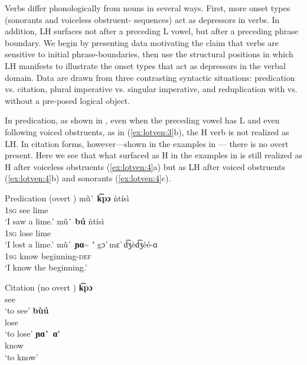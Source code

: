 \documentclass[output=paper
,newtxmath
,modfonts
,nonflat]{langsci/langscibook}
\begin{document}
Verbs differ phonologically from nouns in several ways. First, more onset types (sonorants and voiceless obstruent- sequences) act as depressors in verbs. In addition, LH  surfaces not after a preceding L  vowel, but after a preceding phrase boundary. We begin by presenting data motivating the claim that verbs are sensitive to initial phrase-boundaries, then use the structural positions in which LH  manifests to illustrate the onset types that act as depressors in the verbal domain. Data are drawn from three contrasting syntactic situations: predication vs. citation, plural imperative vs. singular imperative, and reduplication with vs. without a pre-posed logical object.

In predication, as shown in , even when the preceding vowel has L  and even following voiced obstruents, as in (\ref{ex:lotven:3}b), the H  verb is not realized as LH. In citation forms, however—shown in the examples in  — there is no overt  present. Here we see that what surfaced as H in the examples in  is still realized as H after voiceless obstruents (\ref{ex:lotven:4}a) but as LH after voiced obstruents (\ref{ex:lotven:4}b) and sonorants (\ref{ex:lotven:4}c).

\ea\label{ex:lotven:3} Predication (overt )
\ea\label{ex:lotven:3a} \gll mũ\`{}  \textbf{k͡pɔ} ǹtísì\\
1\textsc{sg} see lime \\
\glt ‘I saw a lime.’ 
\ex\label{ex:lotven:3b}	\gll mũ\`{}  \textbf{bú}   ǹtísì\\
1\textsc{sg} lose lime\\
\glt ‘I lost a lime.’
\ex\label{ex:lotven:3c} \gll mũ\`{}  \textbf{ɲɑ\~{} \'{} }     gɔ\`{}mɛ\`{}d͡ʒèd͡ʒèé-ɑ\\
1\textsc{sg} know beginning-\textsc{def} \\
\glt ‘I know the beginning.’
\z
\z


\ea\label{ex:lotven:4} Citation (no overt )
\ea\label{ex:lotven:4a}
    \gll \textbf{k͡pɔ}\\
    see    \\
    \glt ‘to see’
\ex\label{ex:lotven:4b}
	\gll \textbf{bùú}\\
    lose\\
    \glt ‘to lose’
\ex\label{ex:lotven:4c}
	\gll \textbf{ɲɑ\`{} ɑ\'{}} \\
    know\\
    \glt ‘to know’
\z
\z
                           
\end{document}
